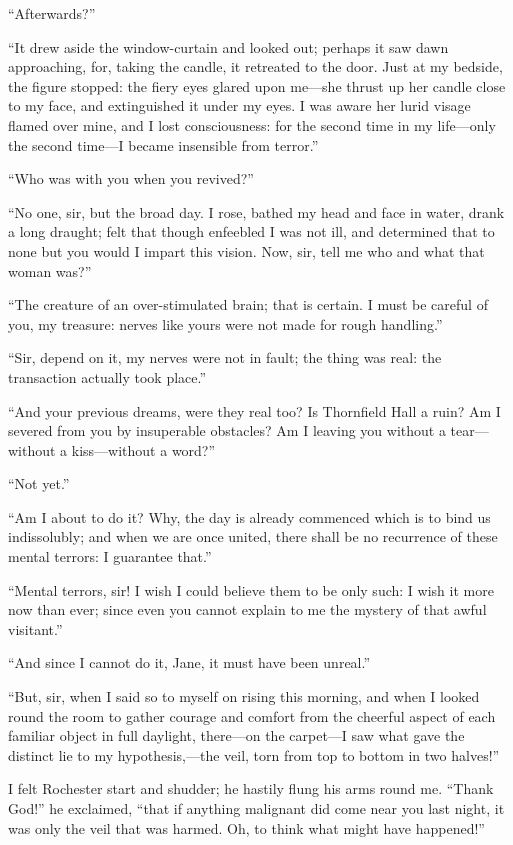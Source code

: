 \enquote{Afterwards?}

\enquote{It drew aside the window-curtain and looked out; perhaps it saw
	dawn approaching, for, taking the candle, it retreated to the door.
	Just at my bedside, the figure stopped: the fiery eyes glared upon
	me---she thrust up her candle close to my face, and extinguished it
	under my eyes.  I was aware her lurid visage flamed over mine, and I
	lost consciousness: for the second time in my life---only the second
	time---I became insensible from terror.}

\enquote{Who was with you when you revived?}

\enquote{No one, sir, but the broad day.  I rose, bathed my head and
	face in water, drank a long draught; felt that though enfeebled I was
	not ill, and determined that to none but you would I impart this
	vision.  Now, sir, tell me who and what that woman was?}

\enquote{The creature of an over-stimulated brain; that is certain.  I
	must be careful of you, my treasure: nerves like yours were not made for
	rough handling.}

\enquote{Sir, depend on it, my nerves were not in fault; the thing was
	real: the transaction actually took place.}

\enquote{And your previous dreams, were they real too?  Is Thornfield
	Hall a ruin?  Am I severed from you by insuperable obstacles?  Am I
	leaving you without a tear---without a kiss---without a word?}

\enquote{Not yet.}

\enquote{Am I about to do it?  Why, the day is already commenced which
	is to bind us indissolubly; and when we are once united, there shall be
	no recurrence of these mental terrors: I guarantee that.}

\enquote{Mental terrors, sir!  I wish I could believe them to be only
	such: I wish it more now than ever; since even you cannot explain to me
	the mystery of that awful visitant.}

\enquote{And since I cannot do it, Jane, it must have been unreal.}

\enquote{But, sir, when I said so to myself on rising this morning, and
	when I looked round the room to gather courage and comfort from the
	cheerful aspect of each familiar object in full daylight, there---on the
	carpet---I saw what gave the distinct lie to my hypothesis,---the veil,
	torn from top to bottom in two halves!}

I felt \Mr{} Rochester start and shudder; he hastily flung his arms round
me.  \enquote{Thank God!} he exclaimed, \enquote{that if anything
	malignant did come near you last night, it was only the veil that was
	harmed.  Oh, to think what might have happened!}

